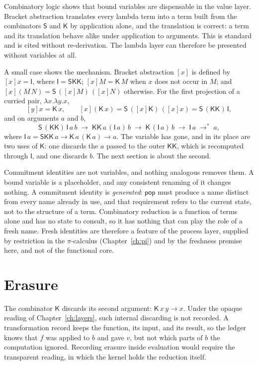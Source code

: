\documentclass[11pt,openany]{book}
\theoremstyle{remark}
\begin{document}
Combinatory logic shows that bound variables are dispensable in the value
layer. Bracket abstraction translates every lambda term into a term built
from the combinators $\mathsf S$ and $\mathsf K$ by application alone, and
the translation is correct: a term and its translation behave alike under
application to arguments. This is standard and is cited without
re-derivation. The lambda layer can therefore be presented without
variables at all.

A small case shows the mechanism. Bracket abstraction $[x]$ is defined by
$[x]x=\mathsf I$, where $\mathsf I=\mathsf S\mathsf K\mathsf K$;
$[x]M=\mathsf K\,M$ when $x$ does not occur in $M$; and
$[x](M\,N)=\mathsf S\,([x]M)\,([x]N)$ otherwise. For the first projection
of a curried pair, $\lambda x.\lambda y.x$,
\[
[y]x=\mathsf K\,x,
\qquad
[x](\mathsf K\,x)=\mathsf S\,([x]\mathsf K)\,([x]x)=\mathsf S\,(\mathsf K\mathsf K)\,\mathsf I,
\]
and on arguments $a$ and $b$,
\[
\mathsf S\,(\mathsf K\mathsf K)\,\mathsf I\,a\,b
\;\to\;\mathsf K\mathsf K\,a\,(\mathsf I\,a)\,b
\;\to\;\mathsf K\,(\mathsf I\,a)\,b
\;\to\;\mathsf I\,a
\;\to^{*}\;a,
\]
where $\mathsf I\,a=\mathsf S\mathsf K\mathsf K\,a\to\mathsf K\,a\,(\mathsf
K\,a)\to a$. The variable has gone, and in its place are two uses of
$\mathsf K$: one discards the $a$ passed to the outer $\mathsf K\mathsf K$,
which is recomputed through $\mathsf I$, and one discards $b$. The next
section is about the second.

Commitment identities are not variables, and nothing analogous removes
them. A bound variable is a placeholder, and any consistent renaming of it
changes nothing. A commitment identity is \emph{generated}: $\mathsf{pop}$
must produce a name distinct from every name already in use, and that
requirement refers to the current state, not to the structure of a term.
Combinatory reduction is a function of terms alone and has no state to
consult, so it has nothing that can play the role of a fresh name. Fresh
identities are therefore a feature of the process layer, supplied by
restriction in the $\pi$-calculus (Chapter~\ref{ch:pi}) and by the
freshness premise here, and not of the functional core.

\section{Erasure}

The combinator $\mathsf K$ discards its second argument:
$\mathsf K\,x\,y\to x$. Under the opaque reading of
Chapter~\ref{ch:layers}, such internal discarding is not recorded. A
transformation record keeps the function, its input, and its result, so
the ledger knows that $f$ was applied to $b$ and gave $v$, but not which
parts of $b$ the computation ignored. Recording erasure inside evaluation
would require the transparent reading, in which the kernel holds the
reduction itself.
\end{document}
